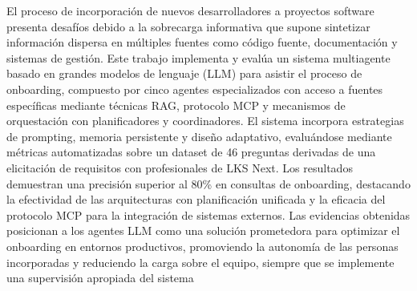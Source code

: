 El proceso de incorporación de nuevos desarrolladores a proyectos software presenta desafíos debido a la sobrecarga informativa que supone sintetizar información dispersa en múltiples fuentes como código fuente, documentación y sistemas de gestión. Este trabajo implementa y evalúa un sistema multiagente basado en grandes modelos de lenguaje (LLM) para asistir el proceso de onboarding, compuesto por cinco agentes especializados con acceso a fuentes específicas mediante técnicas RAG, protocolo MCP y mecanismos de orquestación con planificadores y coordinadores. El sistema incorpora estrategias de prompting, memoria persistente y diseño adaptativo, evaluándose mediante métricas automatizadas sobre un dataset de 46 preguntas derivadas de una elicitación de requisitos con profesionales de LKS Next. Los resultados demuestran una precisión superior al 80\% en consultas de onboarding, destacando la efectividad de las arquitecturas con planificación unificada y la eficacia del protocolo MCP para la integración de sistemas externos. Las evidencias obtenidas posicionan a los agentes LLM como una solución prometedora para optimizar el onboarding en entornos productivos, promoviendo la autonomía de las personas incorporadas y reduciendo la carga sobre el equipo, siempre que se implemente una supervisión apropiada del sistema

